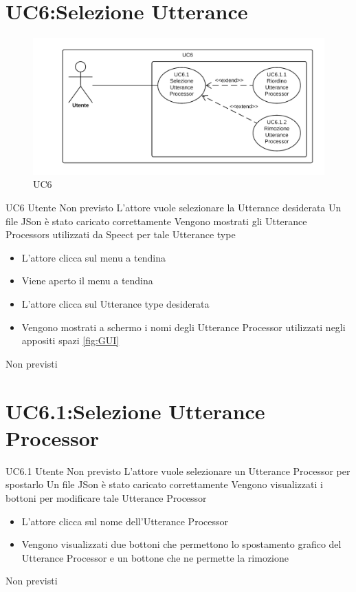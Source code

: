 \documentclass[../AnalisideiRequisiti.tex]{subfiles}
\begin{document}
\section{UC6:Selezione Utterance}
\begin{figure}[H]
	\caption{UC6}
	\centering
	\includegraphics[width=\textwidth]{../img/UC06.png}
\end{figure}
\UserCase
{UC6}
{Utente}
{Non previsto}
{L'attore vuole selezionare la Utterance desiderata}
{Un file JSon è stato caricato correttamente  }
{Vengono mostrati gli Utterance Processors utilizzati da Speect per tale Utterance type}
{
	\begin{itemize}
		\item{} L'attore clicca sul menu a tendina
		\item{} Viene aperto il menu a tendina
		\item{} L'attore clicca sul Utterance type desiderata
		\item{} Vengono mostrati a schermo i nomi degli Utterance Processor utilizzati negli appositi spazi \ref{fig:GUI}		
	\end{itemize}
}
{Non previsti}

\section{UC6.1:Selezione Utterance Processor}
\UserCase
{UC6.1}
{Utente}
{Non previsto}
{L'attore vuole selezionare un Utterance Processor per spostarlo}
{Un file JSon è stato caricato correttamente }
{Vengono visualizzati i bottoni per modificare tale Utterance Processor}
{
	\begin{itemize}
		\item{} L'attore clicca sul nome dell'Utterance Processor
		\item{} Vengono visualizzati due bottoni che permettono lo spostamento grafico del Utterance Processor  e un bottone che ne permette la rimozione  		
	\end{itemize}
}
{Non previsti}
\end{document}
